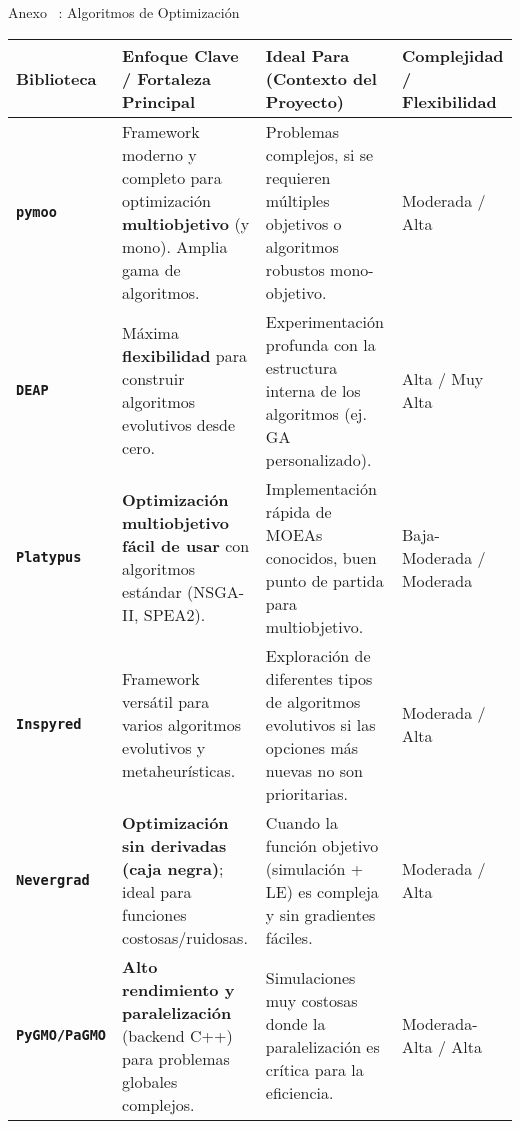 \begin{frame}{Anexo \thesection~: Algoritmos de Optimización}
    \centering
    \label{tab:comparativa}
    \vspace{-0.1cm}
    \begin{adjustbox}{max width=0.9\textwidth,max height=0.4\textheight, keepaspectratio}
        \renewcommand{\arraystretch}{1.3}
            \begin{tabular}{@{}>{\bfseries}p{} p{} p{} p{}@{}}
            \toprule
            \textbf{Biblioteca} & \textbf{Enfoque Clave / Fortaleza Principal} & \textbf{Ideal Para (Contexto del Proyecto)} & \textbf{Complejidad / Flexibilidad} \\
            \midrule
            \rowcolor{yellow!25}
            \texttt{pymoo} & Framework moderno y completo para optimización \textbf{multiobjetivo} (y mono). Amplia gama de algoritmos. & Problemas complejos, si se requieren múltiples objetivos o algoritmos robustos mono-objetivo. & Moderada / Alta \\
            \texttt{DEAP} & Máxima \textbf{flexibilidad} para construir algoritmos evolutivos desde cero. & Experimentación profunda con la estructura interna de los algoritmos (ej. GA personalizado). & Alta / Muy Alta \\
            \texttt{Platypus} & \textbf{Optimización multiobjetivo fácil de usar} con algoritmos estándar (NSGA-II, SPEA2). & Implementación rápida de MOEAs conocidos, buen punto de partida para multiobjetivo. & Baja-Moderada / Moderada \\
            \texttt{Inspyred} & Framework versátil para varios algoritmos evolutivos y metaheurísticas. & Exploración de diferentes tipos de algoritmos evolutivos si las opciones más nuevas no son prioritarias. & Moderada / Alta \\
            \texttt{Nevergrad} & \textbf{Optimización sin derivadas (caja negra)}; ideal para funciones costosas/ruidosas. & Cuando la función objetivo (simulación + LE) es compleja y sin gradientes fáciles. & Moderada / Alta \\
            \texttt{PyGMO/PaGMO} & \textbf{Alto rendimiento y paralelización} (backend C++) para problemas globales complejos. & Simulaciones muy costosas donde la paralelización es crítica para la eficiencia. & Moderada-Alta / Alta \\
            \bottomrule
            \end{tabular}
    \end{adjustbox}
    \smallskip
\end{frame}

